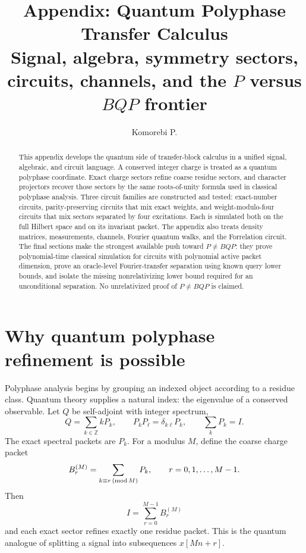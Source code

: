 \documentclass[11pt]{article}
\title{Appendix: Quantum Polyphase Transfer Calculus\\\large Signal, algebra, symmetry sectors, circuits, channels, and the $P$ versus $BQP$ frontier}
\author{Komorebi P.}
\date{}
\newcommand{\Z}{\mathbb Z}
\begin{document}
\maketitle

\begin{abstract}
This appendix develops the quantum side of transfer-block calculus in a unified signal, algebraic, and circuit language.  A conserved integer charge is treated as a quantum polyphase coordinate.  Exact charge sectors refine coarse residue sectors, and character projectors recover those sectors by the same roots-of-unity formula used in classical polyphase analysis.  Three circuit families are constructed and tested: exact-number circuits, parity-preserving circuits that mix exact weights, and weight-modulo-four circuits that mix sectors separated by four excitations.  Each is simulated both on the full Hilbert space and on its invariant packet.  The appendix also treats density matrices, measurements, channels, Fourier quantum walks, and the Forrelation circuit.  The final sections make the strongest available push toward $P\ne BQP$: they prove polynomial-time classical simulation for circuits with polynomial active packet dimension, prove an oracle-level Fourier-transfer separation using known query lower bounds, and isolate the missing nonrelativizing lower bound required for an unconditional separation.  No unrelativized proof of $P\ne BQP$ is claimed.
\end{abstract}

\tableofcontents
\clearpage

\section{Why quantum polyphase refinement is possible}

Polyphase analysis begins by grouping an indexed object according to a residue class.  Quantum theory supplies a natural index: the eigenvalue of a conserved observable.  Let $Q$ be self-adjoint with integer spectrum,
\[
        Q=\sum_{k\in\Z} kP_k,
        \qquad
        P_kP_\ell=\delta_{k\ell}P_k,
        \qquad
        \sum_kP_k=I.
\]
The exact spectral packets are $P_k$.  For a modulus $M$, define the coarse charge packet
\[
        B_r^{(M)}=\sum_{k\equiv r\,({\rm mod}\,M)}P_k,
        \qquad r=0,1,\ldots,M-1.
\]
Then
\[
        I=\sum_{r=0}^{M-1}B_r^{(M)}
\]
and each exact sector refines exactly one residue packet.  This is the quantum analogue of splitting a signal into subsequences $x[Mn+r]$.
\end{document}
